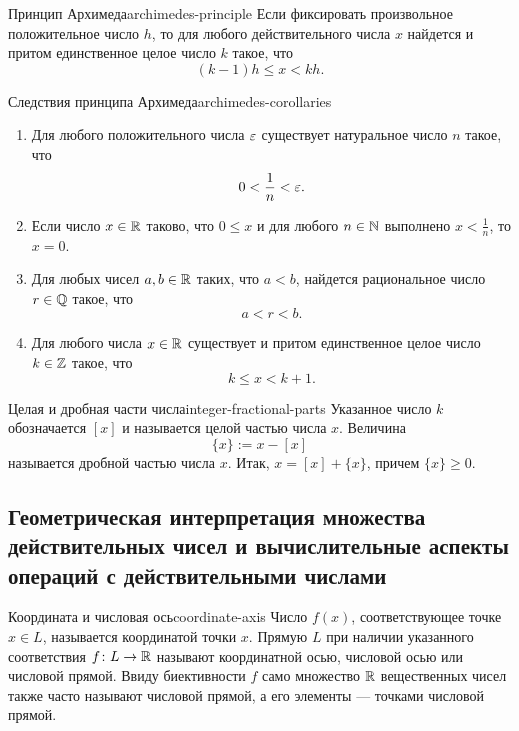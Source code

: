 \begin{properties}{Принцип Архимеда}{archimedes-principle}
  Если фиксировать произвольное положительное число $h$, то для любого
  действительного числа $x$ найдется и притом единственное целое число $k$
  такое, что
  \[
    (k-1)h\le x<kh.
  \]
\end{properties}

\begin{corollary}{Следствия принципа Архимеда}{archimedes-corollaries}
  \begin{enumerate}[label=\arabic*${}^{\circ}$.,start=7]
    \item Для любого положительного числа $\varepsilon$ существует натуральное
      число $n$ такое, что
      \[
        0<\frac1n<\varepsilon.
      \]\par
    \item Если число $x\in\mathbb{R}$ таково, что $0\le x$ и для любого $n\in\mathbb{N}$
      выполнено $x<\frac1n$, то $x=0$.\par
    \item Для любых чисел $a,b\in\mathbb{R}$ таких, что $a<b$, найдется рациональное
      число $r\in\mathbb{Q}$ такое, что
      \[
        a<r<b.
      \]\par
    \item Для любого числа $x\in\mathbb{R}$ существует и притом единственное целое
      число $k\in\mathbb{Z}$ такое, что
      \[
        k\le x<k+1.
      \]
  \end{enumerate}
\end{corollary}

\begin{definition}{Целая и дробная части числа}{integer-fractional-parts}
  Указанное число $k$ обозначается $[x]$ и называется целой частью числа
  $x$. Величина
  \[
    \{x\}:=x-[x]
  \]
  называется дробной частью числа $x$. Итак, $x=[x]+\{x\}$, причем
  $\{x\}\ge0$.
\end{definition}

\subsection[Геометрическая интерпретация и вычислительные аспекты]{Геометрическая интерпретация множества действительных чисел и вычислительные аспекты операций с действительными числами}

\begin{definition}{Координата и числовая ось}{coordinate-axis}
  Число $f(x)$, соответствующее точке $x\in L$, называется координатой
  точки $x$. Прямую $L$ при наличии указанного соответствия
  $f\colon L\to\mathbb{R}$ называют координатной осью, числовой осью или числовой
  прямой. Ввиду биективности $f$ само множество $\mathbb{R}$ вещественных чисел
  также часто называют числовой прямой, а его элементы — точками числовой
  прямой.
\end{definition}

